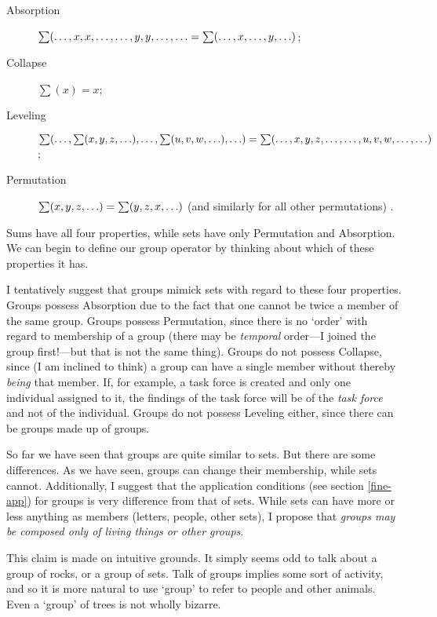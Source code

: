 \documentclass[11pt]{article}
\begin{document}
\begin{spacing}{1.25}
\begin{description}
  \item[Absorption] $\sum (\mathellipsis, x, x, \mathellipsis,
    \mathellipsis, y, y, \mathellipsis, \mathellipsis = \sum (
    \mathellipsis, x, \mathellipsis, y, \mathellipsis )$;
\item[Collapse] $\sum (x) = x$;
\item[Leveling] $\sum (\mathellipsis, \sum (x, y, z, \mathellipsis ),
  \mathellipsis, \sum (u, v, w, \mathellipsis ), \mathellipsis ) = \sum
  (\mathellipsis, x, y, z, \mathellipsis, \mathellipsis, u, v, w,
  \mathellipsis, \mathellipsis )$;
\item[Permutation] $\sum (x, y, z, \mathellipsis ) = \sum (y, z, x,
  \mathellipsis )$ (and similarly for all other permutations)
  \citep[573]{fine2010}.
\end{description}

Sums have all four properties, while sets have only Permutation and
Absorption.  We can begin to define our group operator by thinking
about which of these properties it has.

I tentatively suggest that groups mimick sets with regard to these
four properties.  Groups possess Absorption due to the fact that one
cannot be twice a member of the same group.  Groups possess
Permutation, since there is no `order' with regard to membership of a
group (there may be {\em temporal} order---I joined the group
first!---but that is not the same thing).  Groups do not possess
Collapse, since (I am inclined to think) a group can have a single
member without thereby {\em being} that member.  If, for example, a
task force is created and only one individual assigned to it, the
findings of the task force will be of the {\em task force} and not of
the individual.  Groups do not possess Leveling either, since there
can be groups made up of groups.

So far we have seen that groups are quite similar to sets.  But there
are some differences.  As we have seen, groups can change their
membership, while sets cannot.  Additionally, I suggest that the
application conditions (see section \ref{fine-app}) for groups is very
difference from that of sets.  While sets can have more or less
anything as members (letters, people, other sets), I propose that {\em
  groups may be composed only of living things or other groups}.

This claim is made on intuitive grounds.  It simply seems odd to talk
about a group of rocks, or a group of sets.  Talk of groups implies
some sort of activity, and so it is more natural to use `group' to
refer to people and other animals.  Even a `group' of trees is not
wholly bizarre.


\end{spacing}
\end{document}
